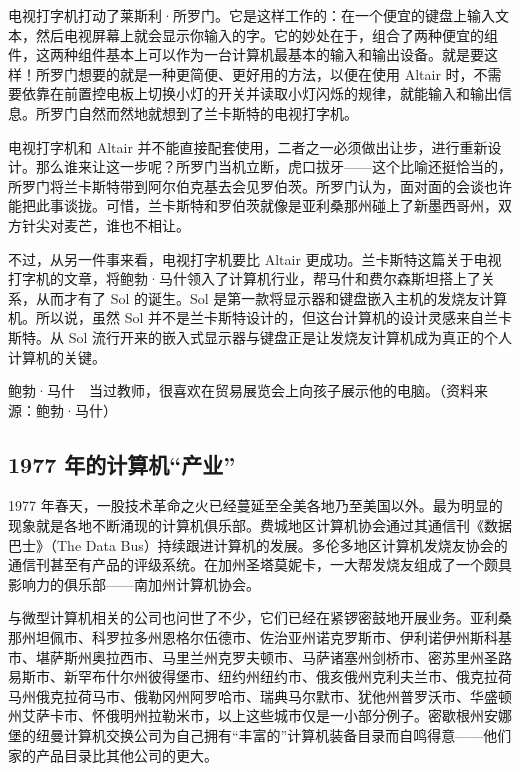 \documentclass[12pt,UTF8]{ctexbook}
\begin{document}
电视打字机打动了莱斯利·所罗门。它是这样工作的：在一个便宜的键盘上输入文本，然后电视屏幕上就会显示你输入的字。它的妙处在于，组合了两种便宜的组件，这两种组件基本上可以作为一台计算机最基本的输入和输出设备。就是要这样！所罗门想要的就是一种更简便、更好用的方法，以便在使用 Altair 时，不需要依靠在前置控电板上切换小灯的开关并读取小灯闪烁的规律，就能输入和输出信息。所罗门自然而然地就想到了兰卡斯特的电视打字机。

电视打字机和 Altair 并不能直接配套使用，二者之一必须做出让步，进行重新设计。那么谁来让这一步呢？所罗门当机立断，虎口拔牙——这个比喻还挺恰当的，所罗门将兰卡斯特带到阿尔伯克基去会见罗伯茨。所罗门认为，面对面的会谈也许能把此事谈拢。可惜，兰卡斯特和罗伯茨就像是亚利桑那州碰上了新墨西哥州，双方针尖对麦芒，谁也不相让。

不过，从另一件事来看，电视打字机要比 Altair 更成功。兰卡斯特这篇关于电视打字机的文章，将鲍勃·马什领入了计算机行业，帮马什和费尔森斯坦搭上了关系，从而才有了 Sol 的诞生。Sol 是第一款将显示器和键盘嵌入主机的发烧友计算机。所以说，虽然 Sol 并不是兰卡斯特设计的，但这台计算机的设计灵感来自兰卡斯特。从 Sol 流行开来的嵌入式显示器与键盘正是让发烧友计算机成为真正的个人计算机的关键。



鲍勃·马什　当过教师，很喜欢在贸易展览会上向孩子展示他的电脑。（资料来源：鲍勃·马什）





\subsection{1977 年的计算机“产业”}


1977 年春天，一股技术革命之火已经蔓延至全美各地乃至美国以外。最为明显的现象就是各地不断涌现的计算机俱乐部。费城地区计算机协会通过其通信刊《数据巴士》（The Data Bus）持续跟进计算机的发展。多伦多地区计算机发烧友协会的通信刊甚至有产品的评级系统。在加州圣塔莫妮卡，一大帮发烧友组成了一个颇具影响力的俱乐部——南加州计算机协会。

与微型计算机相关的公司也问世了不少，它们已经在紧锣密鼓地开展业务。亚利桑那州坦佩市、科罗拉多州恩格尔伍德市、佐治亚州诺克罗斯市、伊利诺伊州斯科基市、堪萨斯州奥拉西市、马里兰州克罗夫顿市、马萨诸塞州剑桥市、密苏里州圣路易斯市、新罕布什尔州彼得堡市、纽约州纽约市、俄亥俄州克利夫兰市、俄克拉荷马州俄克拉荷马市、俄勒冈州阿罗哈市、瑞典马尔默市、犹他州普罗沃市、华盛顿州艾萨卡市、怀俄明州拉勒米市，以上这些城市仅是一小部分例子。密歇根州安娜堡的纽曼计算机交换公司为自己拥有“丰富的”计算机装备目录而自鸣得意——他们家的产品目录比其他公司的更大。
\end{document}
